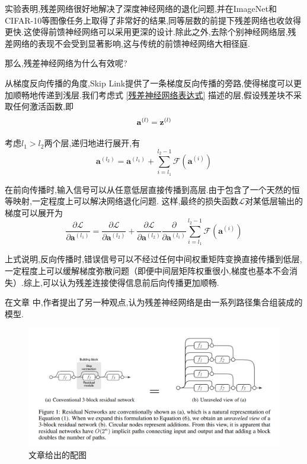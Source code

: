 实验表明,残差网络很好地解决了深度神经网络的退化问题,并在ImageNet和CIFAR-10等图像任务上取得了非常好的结果,同等层数的前提下残差网络也收敛得更快.这使得前馈神经网络可以采用更深的设计.除此之外,去除个别神经网络层,残差网络的表现不会受到显著影响,这与传统的前馈神经网络大相径庭.

那么,残差神经网络为什么有效呢?

从梯度反向传播的角度,Skip Link提供了一条梯度反向传播的旁路,使得梯度可以更加顺畅地传递到浅层.我们考虑式 \ref{残差神经网络表达式} 描述的层,假设残差块不采取任何激活函数,即
\begin{equation}
	\bold{a}^{(l)} = \bold{z}^{(l)}
\end{equation}

考虑$l_1>l_2$两个层,递归地进行展开,有
\begin{equation}
	\mathbf{a}^{\left(l_{2}\right)}=\mathbf{a}^{\left(l_{1}\right)}+\sum_{i=l_{1}}^{l_{2}-1} \mathcal{F}\left(\mathbf{a}^{(i)}\right)
\end{equation}

在前向传播时,输入信号可以从任意低层直接传播到高层.由于包含了一个天然的恒等映射,一定程度上可以解决网络退化问题.
这样,最终的损失函数$\mathcal{L}$对某低层输出的梯度可以展开为
\begin{equation}
	\frac{\partial \mathcal{L}}{\partial \mathbf{a}^{\left(l_{1}\right)}}=\frac{\partial \mathcal{L}}{\partial \mathbf{a}^{\left(l_{2}\right)}}+\frac{\partial \mathcal{L}}{\partial \mathbf{a}^{\left(l_{2}\right)}} \frac{\partial}{\partial \mathbf{a}^{\left(l_{1}\right)}} \sum_{i=l_{1}}^{l_{2}-1} \mathcal{F}\left(\mathbf{a}^{(i)}\right)
\end{equation}

上式说明,反向传播时,错误信号可以不经过任何中间权重矩阵变换直接传播到低层,一定程度上可以缓解梯度弥散问题（即便中间层矩阵权重很小,梯度也基本不会消失）.综上,可以认为残差连接使得信息前后向传播更加顺畅.

在文章 \cite{ResidualNetworksAreExponentialEnsembles} 中,作者提出了另一种观点,认为残差神经网络是由一系列路径集合组装成的模型.

\begin{figure}[htbp]
	\centering
	\includegraphics[scale=0.55]{figures/ResNet集成神经网络解释.png}
	\caption{文章给出的配图}
	\label{}
\end{figure}


